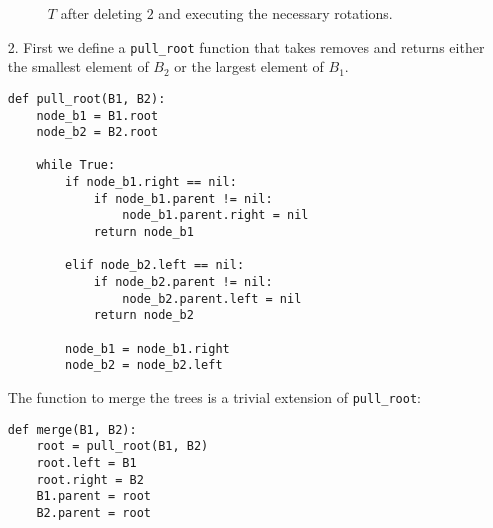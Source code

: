\documentclass{article}
\begin{document}
\begin{enumerate}
    \begin{figure}[p]
    \centering
    \caption{$T$ after deleting $2$ and executing the necessary rotations.}
    \end{figure}

\item [2.] First we define a \texttt{pull\_root} function that takes removes and returns either the smallest element of $B_2$ or the largest element of $B_1$.
\begin{lstlisting}
def pull_root(B1, B2):
    node_b1 = B1.root
    node_b2 = B2.root

    while True:
        if node_b1.right == nil:
            if node_b1.parent != nil:
                node_b1.parent.right = nil
            return node_b1

        elif node_b2.left == nil:
            if node_b2.parent != nil:
                node_b2.parent.left = nil
            return node_b2

        node_b1 = node_b1.right
        node_b2 = node_b2.left
\end{lstlisting}

    The function to merge the trees is a trivial extension of \texttt{pull\_root}:
\begin{lstlisting}
def merge(B1, B2):
    root = pull_root(B1, B2)
    root.left = B1
    root.right = B2
    B1.parent = root
    B2.parent = root
\end{lstlisting}


\end{enumerate}
\end{document}
